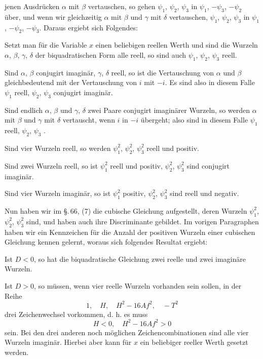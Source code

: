 jenen Ausdrücken $\alpha$ mit $\beta$ vertauschen, so gehen $\psi_1$, $\psi_2$, $\psi_3$ in $\psi_1$, $-\psi_3$, $-\psi_2$ über, und wenn wir gleichzeitig $\alpha$ mit $\beta$ und $\gamma$ mit $\delta$ vertauschen, $\psi_1$, $\psi_2$, $\psi_3$ in $\psi_1$, $-\psi_2$, $-\psi_3$. Daraus ergiebt sich Folgendes:

Setzt man für die Variable $x$ einen beliebigen reellen Werth und sind die Wurzeln $\alpha$, $\beta$, $\gamma$, $\delta$ der biquadratischen Form alle reell, so sind auch $\psi_1$, $\psi_2$, $\psi_3$ reell.

Sind $\alpha$, $\beta$ conjugirt imaginär, $\gamma$, $\delta$ reell, so ist die Vertauschung von $\alpha$ und $\beta$ gleichbedeutend mit der Vertauschung von $i$ mit $-i$. Es sind also in diesem Falle $\psi_1$ reell, $\psi_2$, $\psi_3$ conjugirt imaginär.

Sind endlich $\alpha$, $\beta$ und $\gamma$, $\delta$ zwei Paare conjugirt imaginärer Wurzeln, so werden $\alpha$ mit $\beta$ und $\gamma$ mit $\delta$ vertauscht, wenn $i$ in $-i$ übergeht; also sind in diesem Falle $\psi_1$ reell, $\psi_2$, $\psi_3$ .

Sind vier Wurzeln reell, so werden $\psi_1^2$, $\psi_2^2$, $\psi_3^2$ reell und positiv.

Sind zwei Wurzeln reell, so ist $\psi_1^2$ reell und positiv, $\psi_2^2$, $\psi_3^2$ sind conjugirt imaginär.

Sind vier Wurzeln imaginär, so ist $\psi_1^2$ positiv, $\psi_2^2$, $\psi_3^2$ sind reell und negativ.

Nun haben wir im \S.\,66, (7) die cubische Gleichung aufgestellt, deren Wurzeln $\psi_1^2$, $\psi_2^2$, $\psi_3^2$ sind, und haben auch ihre Discriminante gebildet. Im vorigen Paragraphen haben wir ein Kennzeichen für die Anzahl der positiven Wurzeln einer cubischen Gleichung kennen gelernt, woraus sich folgendes Resultat ergiebt:

Ist $D < 0$, so hat die biquadratische Gleichung zwei reelle und zwei imaginäre Wurzeln.

Ist $D > 0$, so müssen, wenn vier reelle Wurzeln vorhanden sein sollen, in der Reihe
\[
1, \quad H, \quad H^2 - 16 A f^2, \quad -T^2
\]
drei Zeichenwechsel vorkommen, d. h. es muss
\[
H < 0, \quad H^2 - 16 A f^2 > 0
\]
sein. Bei den drei anderen noch möglichen Zeichencombinationen sind alle vier Wurzeln imaginär. Hierbei aber kann für $x$ ein beliebiger reeller Werth gesetzt werden.
